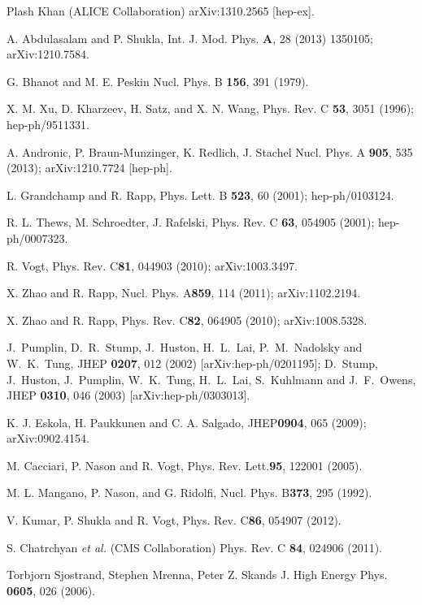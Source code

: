 \documentclass[aps,prc,preprint,superscriptaddress,showpacs,showkeys]{revtex4-1}
\begin{document}
\begin{thebibliography}{100}
 Plash Khan (ALICE Collaboration) arXiv:1310.2565 [hep-ex].


 A. Abdulasalam and P. Shukla, Int. J. Mod. Phys. {\bf A}, 28 (2013) 1350105; arXiv:1210.7584.

 G. Bhanot and M. E. Peskin Nucl. Phys. B {\bf 156}, 391 (1979).

 X. M. Xu, D. Kharzeev, H. Satz, and X. N. Wang, Phys. Rev. C {\bf 53}, 3051 (1996); hep-ph/9511331.

 A. Andronic, P. Braun-Munzinger, K. Redlich, J. Stachel Nucl. Phys. A {\bf 905}, 535 (2013); arXiv:1210.7724 [hep-ph].

 L. Grandchamp and R. Rapp, Phys. Lett. B {\bf 523}, 60 (2001); hep-ph/0103124.

 R. L. Thews, M. Schroedter, J. Rafelski, Phys. Rev. C {\bf 63}, 054905 (2001); hep-ph/0007323.

 R. Vogt, Phys. Rev. C{\bf 81}, 044903 (2010); arXiv:1003.3497.

 X. Zhao and R. Rapp, Nucl. Phys. A{\bf 859}, 114 (2011); arXiv:1102.2194.
 
 X. Zhao and R. Rapp, Phys. Rev. C{\bf 82}, 064905 (2010); arXiv:1008.5328.

 J.~Pumplin, D.~R.~Stump, J.~Huston, H.~L.~Lai, P.~M.~Nadolsky 
and W.~K.~Tung,  JHEP {\bf 0207}, 012 (2002) [arXiv:hep-ph/0201195];
  D.~Stump, J.~Huston, J.~Pumplin, W.~K.~Tung, H.~L.~Lai, S.~Kuhlmann  and J.~F.~Owens,
  JHEP {\bf 0310}, 046 (2003)  [arXiv:hep-ph/0303013].

 K. J. Eskola, H. Paukkunen and C. A. Salgado, JHEP{\bf 0904}, 065 (2009); arXiv:0902.4154.

 M. Cacciari, P. Nason and R. Vogt, Phys. Rev. Lett.{\bf 95}, 122001 (2005).

 M. L. Mangano, P. Nason, and G. Ridolfi, Nucl. Phys. B{\bf 373}, 295 (1992).

 V. Kumar, P. Shukla and R. Vogt, Phys. Rev. C{\bf 86}, 054907 (2012).

 S. Chatrchyan {\it et al.} (CMS Collaboration) Phys. Rev. C {\bf 84}, 024906 (2011).

 Torbjorn Sjostrand, Stephen Mrenna, Peter Z. Skands J. High Energy Phys. {\bf 0605}, 026 (2006). 


\end{thebibliography}
\end{document}
